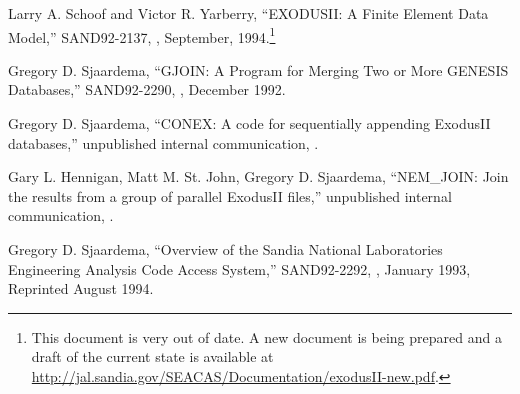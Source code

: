 \begin{thebibliography}{9}

Larry A. Schoof and Victor R. Yarberry, 
``EXODUSII: A Finite Element Data Model,'' 
SAND92-2137, 
\SNLA, 
September, 1994.\footnote{This document is very out of date.  A new
document is being prepared and a draft of the current state is
available at \url{http://jal.sandia.gov/SEACAS/Documentation/exodusII-new.pdf}.}

Gregory D. Sjaardema, 
``GJOIN: A Program for Merging Two or More GENESIS Databases,''
SAND92-2290, 
\SNLA,
December 1992.

Gregory D. Sjaardema,
``CONEX: A code for sequentially appending ExodusII databases,''
unpublished internal communication,
\SNLA.

Gary L. Hennigan, Matt M. St. John, Gregory D. Sjaardema,
``NEM\_JOIN: Join the results from a group of parallel ExodusII files,''
unpublished internal communication,
\SNLA.

Gregory D. Sjaardema,
``Overview of the Sandia National Laboratories Engineering Analysis Code Access System,''
SAND92-2292,
\SNLA,
January 1993, Reprinted August 1994.
\end{thebibliography}
